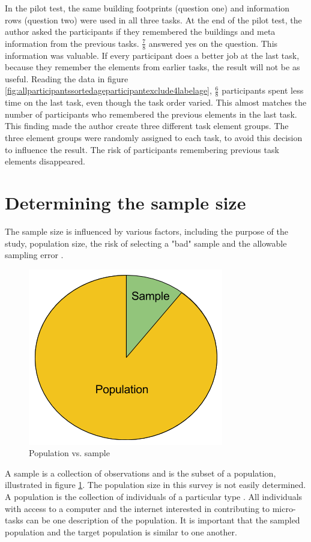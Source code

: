 In the pilot test, the same building footprints (question one) and information rows (question two) were used in all three tasks. At the end of the pilot test, the author asked the participants if they remembered the buildings and meta information from the previous tasks. $\frac{7}{8}$ answered yes on the question. This information was valuable. If every participant does a better job at the last task, because they remember the elements from earlier tasks, the result will not be as useful. Reading the data in figure \ref{fig:allparticipantssortedageparticipantexclude4labelage}, $\frac{6}{8}$ participants spent less time on the last task, even though the task order varied. This almost matches the number of participants who remembered the previous elements in the last task. This finding made the author create three different task element groups. The three element groups were randomly assigned to each task, to avoid this decision to influence the result. The risk of participants remembering previous task elements disappeared.

\section[Sample Size]{Determining the sample size}\label{sec:samplesize}
The sample size is influenced by various factors, including the purpose of the study, population size, the risk of selecting a "bad" sample and the allowable sampling error \citep{Israel1992}. 

\begin{figure}[h]
	\centering
	\includegraphics[width=0.35\linewidth]{fig/popsample}
	\caption{Population vs. sample}
	\label{fig:popsample}
\end{figure}

A sample is a collection of observations and is the subset of a population, illustrated in figure \ref{fig:popsample}. The population size in this survey is not easily determined. A population is the collection of individuals of a particular type \citep{Walpole2012}. All individuals with access to a computer and the internet interested in contributing to micro-tasks can be one description of the population. It is important that the sampled population and the target population is similar to one another.

